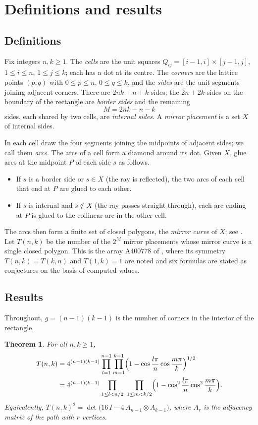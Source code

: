 \documentclass[11pt,a4paper]{amsart}
\newtheorem{theorem}{Theorem}
\theoremstyle{remark}
\begin{document}
\section{Definitions and results}

\subsection{Definitions}
Fix integers $n,k\ge 1$. The \emph{cells} are the unit squares $Q_{ij}=[i-1,i]\times[j-1,j]$, $1\le i\le n$,
$1\le j\le k$; each has a dot at its centre. The \emph{corners} are the lattice points $(p,q)$ with $0\le p\le n$,
$0\le q\le k$, and the \emph{sides} are the unit segments joining adjacent corners. There are $2nk+n+k$ sides; the
$2n+2k$ sides on the boundary of the rectangle are \emph{border sides} and the remaining
\[ M=2nk-n-k \]
sides, each shared by two cells, are \emph{internal sides}. A \emph{mirror placement} is a set $X$ of internal
sides.

In each cell draw the four segments joining the midpoints of adjacent sides; we call them \emph{arcs}. The arcs
of a cell form a diamond around its dot. Given $X$, glue arcs at the midpoint $P$ of each side $s$ as follows.
\begin{itemize}
\item If $s$ is a border side or $s\in X$ (the ray is reflected), the two arcs of each cell that end at $P$ are
glued to each other.
\item If $s$ is internal and $s\notin X$ (the ray passes straight through), each arc ending at $P$ is glued to
the collinear arc in the other cell.
\end{itemize}
The arcs then form a finite set of closed polygons, the \emph{mirror curve} of $X$; see
\cite{Gerdes,JRSZ}. Let $T(n,k)$ be the number of the $2^{M}$ mirror placements whose mirror curve is a single
closed polygon. This is the array A400778 of \cite{OEIS}, where its symmetry $T(n,k)=T(k,n)$ and $T(1,k)=1$ are noted
and six formulas are stated as conjectures on the basis of computed values.

\subsection{Results}
Throughout, $g=(n-1)(k-1)$ is the number of corners in the interior of the rectangle.

\begin{theorem}\label{thm:main}
For all $n,k\ge 1$,
\begin{align}
T(n,k)&=4^{(n-1)(k-1)}\prod_{l=1}^{n-1}\prod_{m=1}^{k-1}\Bigl(1-\cos\frac{l\pi}{n}\cos\frac{m\pi}{k}\Bigr)^{1/2}
\label{eq:main}\\
&=4^{(n-1)(k-1)}\prod_{1\le l<n/2}\ \prod_{1\le m<k/2}\Bigl(1-\cos^2\frac{l\pi}{n}\cos^2\frac{m\pi}{k}\Bigr).
\label{eq:main2}
\end{align}
Equivalently, $T(n,k)^2=\det\bigl(16\,I-4\,A_{n-1}\otimes A_{k-1}\bigr)$, where $A_r$ is the adjacency matrix of the
path with $r$ vertices.
\end{theorem}
\end{document}

